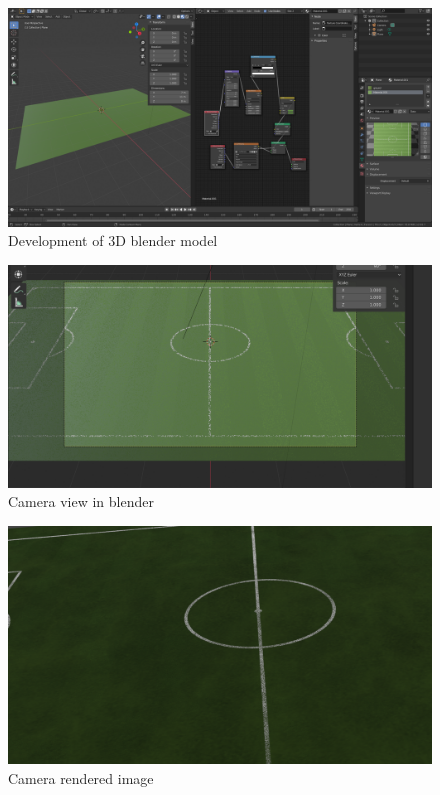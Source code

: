 \documentclass[
    11pt,
    oneside
]{report}
\begin{document}
\begin{appendices}
\begin{figure}[H]
    \includegraphics[keepaspectratio, width=\columnwidth]{Screenshot_from_2021-10-22_13-59-52.png}
    \caption{Development of 3D blender model}
    \label{img:texture}
\end{figure}


\begin{figure}[H]
    \includegraphics[keepaspectratio, width=\columnwidth]{Screenshot_2021-12-17_19-08-06.png}
    \caption{Camera view in blender}
    \label{img:cam_grass}
\end{figure}


\begin{figure}[H]
    \includegraphics[keepaspectratio, width=\columnwidth]{image.png}
    \caption{Camera rendered image}
    \label{img:camera_view}
\end{figure}



\end{appendices}
\end{document}
